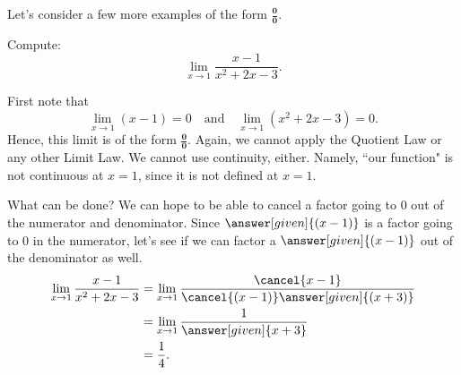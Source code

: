 \documentclass{ximera}
\begin{document}
Let's consider a few more examples of the form $\boldsymbol{\tfrac{0}{0}}$.

\begin{example}
  Compute:
  \[
  \lim_{x\to1}\frac{x-1}{x^2+2x-3}.
  \]
  \begin{explanation}
    First note that
    \[
    \lim_{x\to1}\left(x-1\right)=0 \quad\text{and}\quad  \lim_{x\to1}\left(x^2+2x-3\right) = 0.
    \]
    Hence, this limit is of the form $\boldsymbol{\tfrac{0}{0}}$. Again, we cannot apply the Quotient Law or any other Limit Law. We cannot use continuity, either. Namely, ``our function" is not continuous at $x=1$, since it is not defined 
    at $x=1$. 
    
    What can be done? We can hope to be able to  cancel a factor going to $0$ out of the numerator and
    denominator.  Since $\answer[given]{(x-1)}$ is a factor going to $0$ in the
    numerator, let's see if we can factor a $\answer[given]{(x-1)}$ out of the
    denominator as well.
    \begin{align*}
      \lim_{x\to1}\frac{x-1}{x^2+2x-3}&=\lim_{x\to1}\frac{\cancel{x-1}}{\cancel{(x-1)}\answer[given]{(x+3)}} \\
      &=\lim_{x\to1}\frac{1}{\answer[given]{x+3}}\\
      &=\frac{1}{4}.
    \end{align*}
  \end{explanation}
\end{example}
\end{document}
